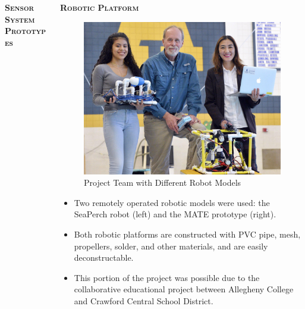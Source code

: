\documentclass[final,t]{beamer}
\begin{document}
\begin{frame}{}
\begin{columns}
\begin{column}{.5\linewidth}
\begin{block}{\textsc{\textbf{Sensor System Prototypes}}}
  					\end{block}
            \end{column}

            \begin{column}{.5\linewidth}

                \begin{block}{\textsc{\textbf{Robotic Platform}}}
                    \vspace*{3mm}
                    \begin{figure}
                    \centering
                        \includegraphics[scale = 0.9]{assets/group_pic.jpg}
                        \caption{Project Team with Different Robot Models}
                    \end{figure}

                    \begin{itemize}
                    	\item Two remotely operated robotic models were used: the
                      SeaPerch robot (left) and the MATE prototype (right).
                    	\item Both robotic platforms are constructed with PVC pipe,
                      mesh, propellers, solder, and other materials, and are easily
                      deconstructable.
                    	\item This portion of the project was possible due to the
                      collaborative educational project between Allegheny College
                      and Crawford Central School District.
                    \end{itemize}


\end{block}
\end{column}
\end{columns}
\end{frame}
\end{document}
